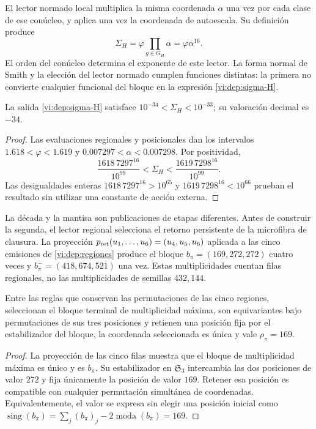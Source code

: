 El lector normado local multiplica la misma coordenada \(\alpha\)
una vez por cada clase de ese conúcleo, y aplica una vez la coordenada
de autoescala. Su definición produce
\begin{equation}
 \Sigma_H=\varphi\prod_{g\in G_H}\alpha
         =\varphi\alpha^{16}.
 \label{vi:dep:sigma-H}
\end{equation}
El orden del conúcleo determina el exponente de este lector. La forma
normal de Smith y la elección del lector normado cumplen funciones
distintas: la primera no convierte cualquier funcional del bloque en
la expresión \eqref{vi:dep:sigma-H}.

\begin{proposition}
\label{vi:dep:decada}
La salida \eqref{vi:dep:sigma-H} satisface
\(10^{-34}<\Sigma_H<10^{-33}\); su valoración decimal es \(-34\).
\end{proposition}
\begin{proof}
Las evaluaciones regionales y posicionales dan los intervalos
\(1.618<\varphi<1.619\) y \(0.007297<\alpha<0.007298\).
Por positividad,
\[
 \frac{1618\,7297^{16}}{10^{99}}
 <\Sigma_H<
 \frac{1619\,7298^{16}}{10^{99}}.
\]
Las desigualdades enteras
\(1618\,7297^{16}>10^{65}\) y
\(1619\,7298^{16}<10^{66}\) prueban el resultado sin utilizar una
constante de acción externa.
\end{proof}

La década y la mantisa son publicaciones de etapas diferentes.
Antes de construir la segunda, el lector regional selecciona el retorno
persistente de la microfibra de clausura. La proyección
\(p_{\rm ret}(u_1,\ldots,u_6)=(u_4,u_5,u_6)\) aplicada a las
cinco emisiones de \ref{vi:dep:regiones} produce el bloque
\(b_\pi=(169,272,272)\) cuatro veces y
\(b_\pi^-=(418,674,521)\) una vez. Estas multiplicidades cuentan
filas regionales, no las multiplicidades de semillas \(432,144\).

\begin{proposition}
\label{vi:dep:selector169}
Entre las reglas que conservan las permutaciones de las cinco regiones,
seleccionan el bloque terminal de multiplicidad máxima, son equivariantes
bajo permutaciones de sus tres posiciones y retienen una posición fija
por el estabilizador del bloque, la coordenada seleccionada es única
y vale \(\rho_\pi=169\).
\end{proposition}
\begin{proof}
La proyección de las cinco filas muestra que el bloque de multiplicidad
máxima es único y es \(b_\pi\). Su estabilizador en
\(\mathfrak S_3\) intercambia las dos posiciones de valor \(272\)
y fija únicamente la posición de valor \(169\). Retener esa posición
es compatible con cualquier permutación simultánea de coordenadas.
Equivalentemente, el valor se expresa sin elegir una posición inicial
como
\(\operatorname{sing}(b_\pi)=\sum_j(b_\pi)_j
-2\operatorname{moda}(b_\pi)=169\).
\end{proof}

